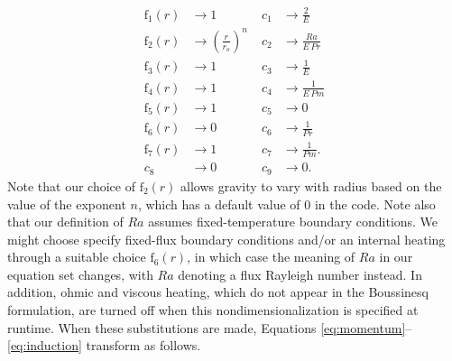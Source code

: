 \documentclass[10pt,letterpaper]{article}
\newcommand{\ff}{\mathrm{f}}
\begin{document}
\begin{align*}
\ff_1(r) &\rightarrow 1\; &c_1 &\rightarrow \frac{2}{E} \\
\ff_2(r) &\rightarrow \left(\frac{r}{r_o}\right)^n \; &c_2 &\rightarrow \frac{Ra}{E\,Pr} \\
\ff_3(r) &\rightarrow 1\; &c_3 &\rightarrow \frac{1}{E}\\
\ff_4(r) &\rightarrow 1\; &c_4 &\rightarrow \frac{1}{E\,Pm} \\
\ff_5(r) &\rightarrow 1\; &c_5 &\rightarrow 0 \\
\ff_6(r) &\rightarrow 0\; &c_6 &\rightarrow \frac{1}{Pr}  \\
\ff_7(r) &\rightarrow 1\; &c_7 &\rightarrow \frac{1}{Pm}. \\
c_8&\rightarrow 0 &c_9 &\rightarrow 0.
\end{align*}
Note that our choice of $\ff_2(r)$ allows gravity to vary with radius based on the value of the exponent $n$, which has a default value of 0 in the code.  Note also that our definition of $Ra$ assumes fixed-temperature boundary conditions.  We might choose specify fixed-flux boundary conditions and/or an internal heating through a suitable choice $\ff_6(r)$, in which case the meaning of $Ra$ in our equation set changes, with $Ra$ denoting a flux Rayleigh number instead.  In addition, ohmic and viscous heating, which do not appear in the Boussinesq formulation, are turned off when this nondimensionalization is specified at runtime.   When these substitutions are made, Equations \ref{eq:momentum}--\ref{eq:induction} transform as follows.
\end{document}
